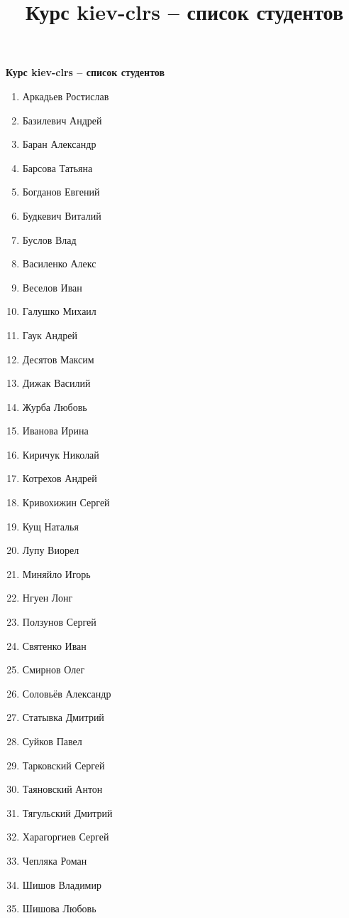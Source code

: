 \documentclass[a4paper,11pt]{article}
\title{Курс kiev-clrs -- список студентов}
\begin{document}
\textbf{Курс kiev-clrs -- список студентов}

\begin{multicols}{2}
\begin{enumerate}

\item Аркадьев Ростислав
\item Базилевич Андрей
\item Баран Александр
\item Барсова Татьяна
\item Богданов Евгений
\item Будкевич Виталий
\item Буслов Влад
\item Василенко Алекс
\item Веселов Иван
\item Галушко Михаил
\item Гаук Андрей
\item Десятов Максим
\item Дижак Василий
\item Журба Любовь
\item Иванова Ирина
\item Киричук Николай
\item Котрехов Андрей
\item Кривохижин Сергей
\item Кущ Наталья
\item Лупу Виорел
\item Миняйло Игорь
\item Нгуен Лонг
\item Ползунов Сергей
\item Святенко Иван
\item Смирнов Олег
\item Соловьёв Александр
\item Статывка Дмитрий
\item Суйков Павел
\item Тарковский Сергей
\item Таяновский Антон
\item Тягульский Дмитрий
\item Харагоргиев Сергей
\item Чепляка Роман
\item Шишов Владимир
\item Шишова Любовь

\end{enumerate}
\end{multicols}
\end{document}
